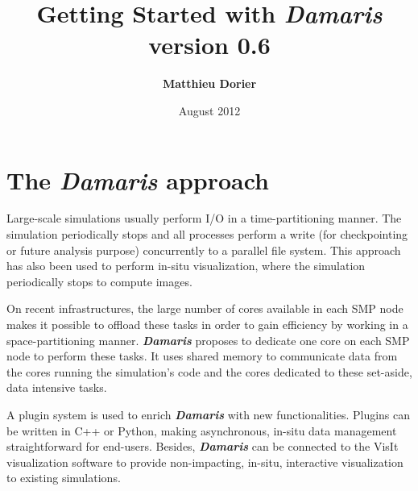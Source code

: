 \documentclass[11pt]{report}
\newcommand{\Damaris}{\emph{\textbf{Damaris}}}
\begin{document}
\title{\Huge{ 
	 Getting Started with \Damaris{}} \\
	\normalsize{} version 0.6}

\author{\textbf{Matthieu Dorier}}
\date{August 2012}
\maketitle

\setcounter{tocdepth}{1}
\tableofcontents

\chapter*{The \Damaris{} approach}

Large-scale simulations usually perform I/O in a time-partitioning manner.
The simulation periodically stops and all processes perform a write (for checkpointing
or future analysis purpose) concurrently to a parallel file system. This approach has also been
used to perform in-situ visualization, where the simulation periodically stops to compute images.

On recent infrastructures, the large number of cores available in each SMP node makes
it possible to offload these tasks in order to gain efficiency by working in a space-partitioning manner.
\Damaris{} proposes to dedicate one core on each SMP node to perform these tasks.
It uses shared memory to communicate data from the cores running the simulation's code and
the cores dedicated to these set-aside, data intensive tasks.

A plugin system is used to enrich \Damaris{} with new functionalities. Plugins can be written
in C++ or Python, making asynchronous, in-situ data management straightforward for end-users.
Besides, \Damaris{} can be connected to the VisIt visualization software to provide
non-impacting, in-situ, interactive visualization to existing simulations.



\end{document}
